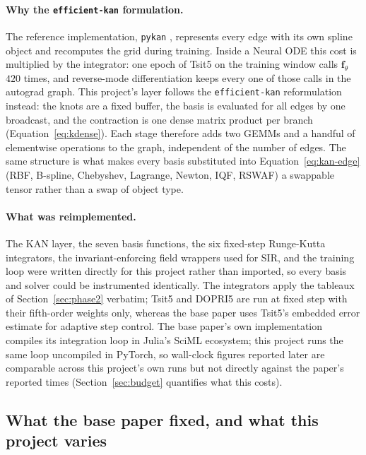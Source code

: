 \paragraph{Why the \texttt{efficient-kan} formulation.} The reference
implementation, \texttt{pykan} \cite{liu2024kan}, represents every edge with
its own spline object and recomputes the grid during training. Inside a
Neural ODE this cost is multiplied by the integrator: one epoch of Tsit5 on
the training window calls $\mathbf{f}_\theta$ $420$ times, and reverse-mode
differentiation keeps every one of those calls in the autograd graph. This
project's layer follows the \texttt{efficient-kan} reformulation
\cite{blealtan2024efficientkan} instead: the knots are a fixed buffer,
the basis is evaluated for all edges by one broadcast, and the contraction is
one dense matrix product per branch (Equation~\ref{eq:kdense}). Each stage
therefore adds two GEMMs and a handful of elementwise operations to the
graph, independent of the number of edges. The same structure is what makes
every basis substituted into Equation~\ref{eq:kan-edge} (RBF, B-spline,
Chebyshev, Lagrange, Newton, IQF, RSWAF) a swappable tensor rather than a
swap of object type.

\paragraph{What was reimplemented.} The KAN layer, the seven basis
functions, the six fixed-step Runge-Kutta integrators, the invariant-enforcing
field wrappers used for SIR, and the training loop were written directly for
this project rather than imported, so every basis and solver could be
instrumented identically. The integrators apply the tableaux of
Section~\ref{sec:phase2} verbatim; Tsit5 and DOPRI5 are run at fixed step
with their fifth-order weights only, whereas the base paper uses Tsit5's
embedded error estimate for adaptive step control. The base paper's own
implementation compiles its integration loop in Julia's SciML ecosystem; this
project runs the same loop uncompiled in PyTorch, so wall-clock figures
reported later are comparable across this project's own runs but not
directly against the paper's reported times (Section~\ref{sec:budget}
quantifies what this costs).

\subsection{What the base paper fixed, and what this project varies}


